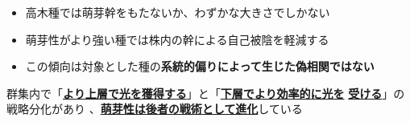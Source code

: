 \documentclass[a0, 30pt, plainboxedsections, draft]{sciposter} %
\renewcommand{\baselinestretch}{1.2}
\begin{document}
\begin{multicols}{2}
\begin{mdframed}[style=conclusion.frame,frametitle={\textbf{\Large{\faFlagAlt \vspace{0.02em} 結論: {萌芽性は樹高と背反的に進化しており、\\\hspace*{2.8em}群集の中に多様な萌芽性をもつ種が存在する}}}}]
{  \begin{itemize}
    \item 高木種では萌芽幹をもたないか、わずかな大きさでしかない
    \item 萌芽性がより強い種では株内の幹による自己被陰を軽減する
    \item この傾向は対象とした種の\textbf{系統的偏りによって生じた偽相関ではない}
\end{itemize}
  }
  
  \faHandLeft 群集内で「\textbf{\underline{より上層で光を獲得する}}」と「\textbf{\underline{下層でより効率的に光を}} \textbf{\underline{受ける}}」の戦略分化があり
  、\textbf{\underline{萌芽性は後者の戦術として進化}}している
 
\end{mdframed}

\end{multicols}
\begin{mdframed}[style=section.frame]
  \centering\LARGE\textbf{\color{white}{方法}}
\end{mdframed}\vspace{-1.2em}
\end{document}
